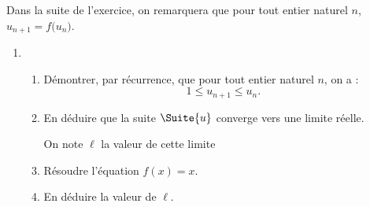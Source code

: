 Dans la suite de l'exercice, on remarquera que pour tout entier naturel $n$, $u_{n+1} = f\big(u_n\big)$.

\begin{enumerate}[resume]
	\item 
	\begin{enumerate}
		\item Démontrer, par récurrence, que pour tout entier naturel $n$, on a : \[ 1 \leqslant u_{n+1} \leqslant u_n. \]
		\item En déduire que la suite $\Suite{u}$ converge vers une limite réelle.
		
		On note $\ell$ la valeur de cette limite 
		\item Résoudre l'équation $f(x) = x$.
		\item En déduire la valeur de $\ell$.
	\end{enumerate}
\end{enumerate}